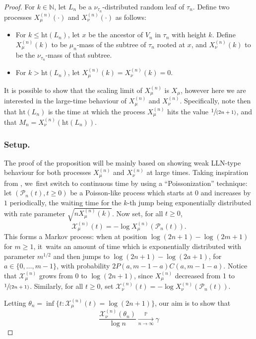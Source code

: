 \documentclass[JEP,XML,SOM,Unicode,NoFloatCountersInSection, NoEqCountersInSection,published]{cedram}
\newcommand{\spfrac}[2]{\sfrac{#1}{(#2)}}
\newcommand{\xnun}{X^{(n)}_{\nu}}
\newcommand{\xmun}{X^{(n)}_{\mu}}
\newcommand{\Xmun}{\mathcal{X}^{(n)}_{\mu}}
\newcommand{\Xnun}{\mathcal{X}^{(n)}_{\nu}}
\let\dH\gamma
\newcommand{\N}{\mathbb{N}}
\newcommand{\pr}{\mathbb{P}}
\newcommand{\h}{\mathrm{ht}}
\theoremstyle{definition}
\begin{document}
\begin{proof} For $k\in\N$, let $L_n$ be a $\nu_{\tau_n}$-distributed random leaf of $\tau_n$. Define two processes $\xmun(\cdot)$ and $\xnun(\cdot)$ as follows:
\begin{itemize}
\item For $k \leq \mathrm{ht}(L_n)$, let $x$ be the ancestor of $V_n$ in $\tau_n$ with height $k$. Define $\xmun(k)$ to be $\mu_n$-mass of the subtree of $\tau_n$ rooted at $x$, and $\xnun(k)$ to be the $\nu_{\tau_n}$-mass of that subtree.
\item For $ k> \mathrm{ht}(L_n)$, let $\xmun(k)=\xnun(k)=0$.
\end{itemize}
It is possible to show that the scaling limit of $\xmun$ is $X_\mu$, however here we are interested in the large-time behaviour of $\xmun$ and $\xnun$. Specifically, note then that $\h(L_n)$ is the time at which the process $X^{(n)}_{\mu}$ hits the value $\spfrac1{2n+1}$, and that $M_n=X^{(n)}_{\nu}(\h(L_n))$.

\subsubsection*{Setup.}
The proof of the proposition will be mainly based on showing weak LLN-type behaviour for both processes $X^{(n)}_{\mu}$ and $X^{(n)}_{\nu}$ at large times. Taking inspiration from \cite{BK14}, we~first switch to continuous time by using a ``Poissonization'' technique: let $(\mathcal{P}_n(t),t\geq 0)$ be a Poisson-like process which starts at $0$ and increases by $1$ periodically, the waiting time for the $k$-th jump being exponentially distributed with rate parameter $\sqrt{nX^{(n)}_{\mu}(k)}$. Now set, for all $t\geq0$,\vspace*{-3pt}
\[
\mathcal{X}^{(n)}_{\mu}(t)=-\log X^{(n)}_{\mu}(\mathcal{P}_n(t)).
\]
This forms a Markov process: when at position $\log (2n+1) -\log (2m+1)$ for $m\geq 1$, it~waits an amount of time which is exponentially distributed with parameter $m^{1/2}$ and then jumps to $\log (2n+1) -\log (2a+1)$, for $a\in\{0,\ldots,m-1\}$, with probability $2P(a,m-1-a)C(a,m-1-a)$. Notice that $\mathcal{X}^{(n)}_{\mu}$ grows from $0$ to $\log(2n+1)$, since $X^{(n)}_{\mu}$ decreased from 1 to $\spfrac1{2n+1}$. Similarly, for all $t\geq0$, set $\mathcal{X}^{(n)}_{\nu}(t)=-\log X^{(n)}_{\nu}(\mathcal{P}_n(t))$.

Letting $\theta_n=\inf\{t: \Xmun(t) = \log (2n+1)\}$, our aim is to show that\vspace*{-3pt}
\begin{equation}\label{eq:loglimittimeprob0}
\frac{ \Xnun(\theta_n)}{\log n} \xrightarrow[\textstyle n\to\infty]{\textstyle\pr} \dH
\end{equation}


\end{proof}
\end{document}
